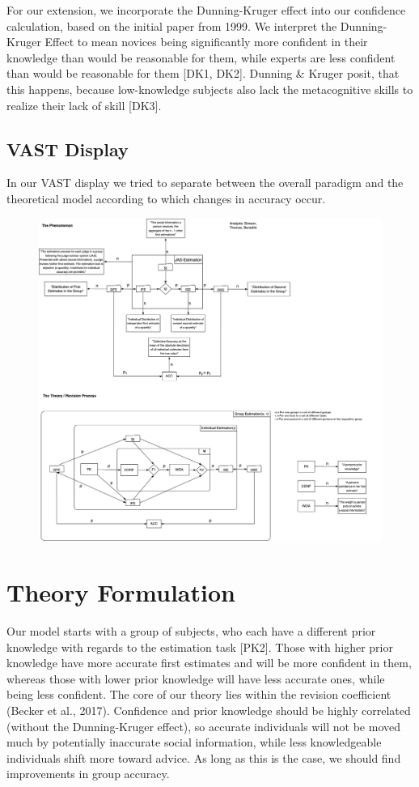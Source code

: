 \documentclass[
  man,floatsintext]{apa6}
\begin{document}
For our extension, we incorporate the Dunning-Kruger effect into our confidence calculation, based on the initial paper from 1999. We interpret the Dunning-Kruger Effect to mean novices being significantly more confident in their knowledge than would be reasonable for them, while experts are less confident than would be reasonable for them {[}DK1, DK2{]}. Dunning \& Kruger posit, that this happens, because low-knowledge subjects also lack the metacognitive skills to realize their lack of skill {[}DK3{]}.

\hypertarget{vast-display}{%
\subsection{VAST Display}\label{vast-display}}

In our VAST display we tried to separate between the overall paradigm and the theoretical model according to which changes in accuracy occur.

\begin{figure}[H]
\includegraphics[width=0.9\linewidth]{VAST_Image} \caption{ }\label{fig:unnamed-chunk-1}
\end{figure}

\hypertarget{theory-formulation}{%
\section{Theory Formulation}\label{theory-formulation}}

Our model starts with a group of subjects, who each have a different prior knowledge with regards to the estimation task {[}PK2{]}. Those with higher prior knowledge have more accurate first estimates and will be more confident in them, whereas those with lower prior knowledge will have less accurate ones, while being less confident. The core of our theory lies within the revision coefficient (Becker et al., 2017). Confidence and prior knowledge should be highly correlated (without the Dunning-Kruger effect), so accurate individuals will not be moved much by potentially inaccurate social information, while less knowledgeable individuals shift more toward advice. As long as this is the case, we should find improvements in group accuracy.
\end{document}

